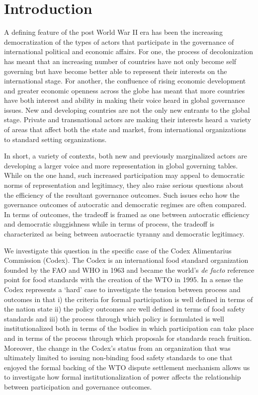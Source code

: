\section{Introduction}


A defining feature of the post World War II era has been the increasing democratization of the types of actors that participate in the governance of international political and economic affairs. For one, the process of decolonization has meant that an increasing number of countries have not only become self governing but have become better able to represent their interests on the international stage. For another, the confluence of rising economic development and greater economic openness across the globe has meant that more countries have both interest and ability in making their voice heard in global governance issues. New and developing countries are not the only new entrants to the global stage. Private and transnational actors are making their interests heard a variety of areas that affect both the state and market, from international organizations to standard setting organizations. 

In short, a variety of contexts, both new and previously marginalized actors are developing a larger voice and more representation in global governing tables. While on the one hand, such increased participation may appeal to democratic norms of representation and legitimacy, they also raise serious questions about the efficiency of the resultant governance outcomes. Such issues echo how the governance outcomes of autocratic and democratic regimes are often compared. In terms of outcomes, the tradeoff is framed as one between autocratic efficiency and democratic sluggishness while in terms of process, the tradeoff is characterized as being between autocractic tyranny and democratic legitimacy. 

We investigate this question in the specific case of the Codex Alimentarius Commission (Codex). The Codex is an international food standard organization founded by the FAO and WHO in 1963 and became the world's \textit{de facto} reference point for food standards with the creation of the WTO in 1995. In a sense the Codex represents a `hard' case to investigate the tension between process and outcomes in that i) the criteria for formal participation is well defined in terms of the nation state ii) the policy outcomes are well defined in terms of food safety standards and iii) the process through which policy is formulated is well institutionalized both in terms of the bodies in which participation can take place and in terms of the process through which proposals for standards reach fruition. Moreover, the change in the Codex's status from an organization that was ultimately limited to issuing non-binding food safety standards to one that enjoyed the formal backing of the WTO dispute settlement mechanism allows us to investigate how formal institutionalization of power affects the relationship between participation and governance outcomes. 